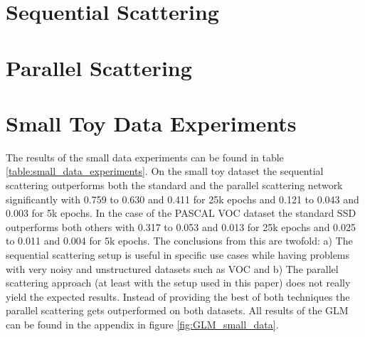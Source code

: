 \section{Sequential Scattering}


\section{Parallel Scattering}


\section{Small Toy Data Experiments}

The results of the small data experiments can be found in table \ref{table:small_data_experiments}. On the small toy dataset the sequential scattering outperforms both the standard and the parallel scattering network significantly with 0.759 to 0.630 and 0.411 for 25k epochs and 0.121 to 0.043 and 0.003 for 5k epochs. In the case of the PASCAL VOC dataset the standard SSD outperforms both others with 0.317 to 0.053 and 0.013 for 25k epochs and 0.025 to 0.011 and 0.004 for 5k epochs. The conclusions from this are twofold: a) The sequential scattering setup is useful in specific use cases while having problems with very noisy and unstructured datasets such as VOC and b) The parallel scattering approach (at least with the setup used in this paper) does not really yield the expected results. Instead of providing the best of both techniques the parallel scattering gets outperformed on both datasets. All results of the GLM can be found in the appendix in figure \ref{fig:GLM_small_data}. 


